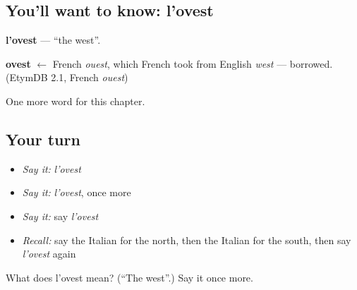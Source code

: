 \subsection*{You'll want to know: l'ovest}
\textbf{l'ovest} — \textquotedblleft{}the west\textquotedblright{}.

\begin{cousinweb}
\textbf{ovest} $\leftarrow$ French \emph{ouest}, which French took from English \emph{west} — borrowed. (EtymDB 2.1, French \emph{ouest})
\end{cousinweb}

\begin{grammarlens}[title={What you've built}]
One more word for this chapter.
\end{grammarlens}

\subsection*{Your turn}
\begin{itemize}
\raggedright
  \item \emph{Say it:} \emph{l'ovest}
  \item \emph{Say it:} \emph{l'ovest}, once more
  \item \emph{Say it:} say \emph{l'ovest}
  \item \emph{Recall:} say the Italian for the north, then the Italian for the south, then say \emph{l'ovest} again
\end{itemize}

\begin{tcolorbox}[breakable,colback=teal!4,colframe=teal!35!black,title={Before you move on}]
What does l'ovest mean? (\textquotedblleft{}The west\textquotedblright{}.) Say it once more.
\end{tcolorbox}
